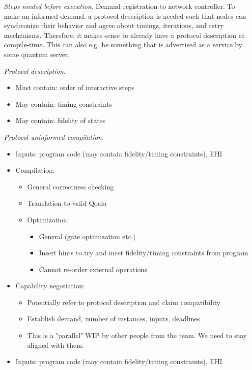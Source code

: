 \textit{Steps needed before execution}.
Demand registration to network controller. To make an informed demand, a protocol description is needed such that nodes can synchronize their behavior and agree about timings, iterations, and retry mechanisms. Therefore, it makes sense to already have a protocol description at compile-time. This can also e.g. be something that is advertised as a service by some quantum server.

\textit{Protocol description}.
\begin{itemize}
    \item Must contain: order of interactive steps
    \item May contain: timing constraints
    \item May contain: fidelity of states
\end{itemize}

\textit{Protocol-uninformed compilation}.
\begin{itemize}
\item Inputs: program code (may contain fidelity/timing constraints), EHI
\item Compilation:
    \begin{itemize}
        \item General correctness checking
        \item Translation to valid Qoala
        \item Optimization:
            \begin{itemize}
                \item General (gate optimization etc.)
                \item Insert hints to try and meet fidelity/timing constraints from program
                \item Cannot re-order external operations
        \end{itemize}
    \end{itemize}
\item Capability negotiation:
    \begin{itemize}
        \item Potentially refer to protocol description and claim compatibility
        \item Establish demand, number of instances, inputs, deadlines
        \item This is a "parallel" WIP by other people from the team. We need to stay aligned with them.
    \end{itemize}
\item Inputs: program code (may contain fidelity/timing constraints), EHI
\end{itemize}

